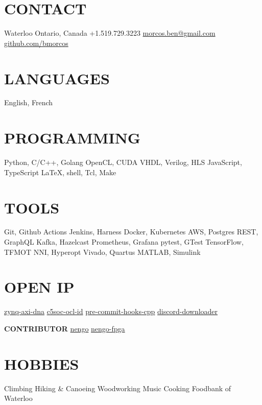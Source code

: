 \documentclass[a4paper,nocolors]{cv-friggeri-ben}
\begin{document}


\begin{aside} %
    \section{CONTACT}
    \hfill Waterloo
    \hfill Ontario, Canada
    \vspace{0.5\baselineskip} \hfill +1.519.729.3223
    \hfill \href{mailto:morcos.ben@gmail.com}{morcos.ben@gmail.com}
    \vspace{0.5\baselineskip} \hfill%
    \href{https://github.com/bmorcos}{github.com/bmorcos}
    \section{LANGUAGES}
    English, French
    \section{PROGRAMMING}
    Python, C/C++, Golang
    OpenCL, CUDA
    VHDL, Verilog, HLS
    JavaScript, TypeScript
    \LaTeX, shell, Tcl, Make
    \section{TOOLS}
    Git, Github Actions
    Jenkins, Harness
    Docker, Kubernetes
    AWS, Postgres
    REST, GraphQL
    Kafka, Hazelcast
    Prometheus, Grafana
    pytest, GTest
    TensorFlow, TFMOT
    NNI, Hyperopt
    Vivado, Quartus
    MATLAB, Simulink
    \section{OPEN IP}
    \href{https://github.com/abr/zynq-axi-dna}{zynq-axi-dna}
    \href{https://github.com/abr/c5soc-ocl-id}{c5soc-ocl-id}
    \href{https://github.com/bmorcos/pre-commit-hooks-cpp}{pre-commit-hooks-cpp}
    \href{https://github.com/bmorcos/discord-downloader}{discord-downloader}
    \par\vspace{0.5\baselineskip}\textbf{CONTRIBUTOR}
    \href{https://github.com/nengo/nengo}{nengo}
    \href{https://github.com/nengo/nengo-fpga}{nengo-fpga}
    \section{HOBBIES}
    Climbing
    Hiking \& Canoeing
    Woodworking
    Music
    Cooking
    Foodbank of Waterloo
\end{aside}
\end{document}
